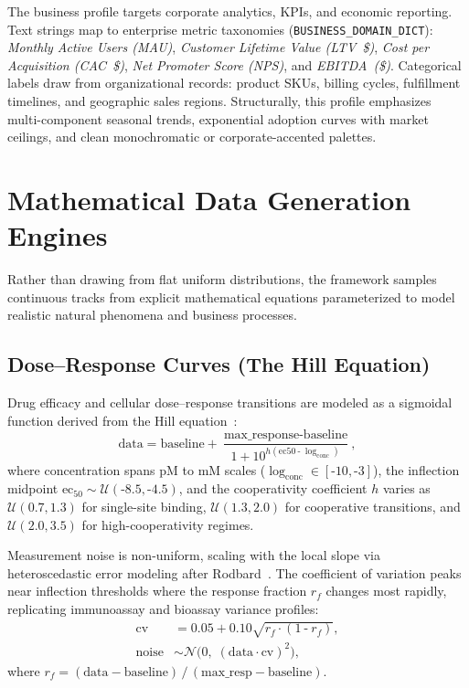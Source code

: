 \documentclass[11pt,twocolumn]{article}
\newcommand{\N}{\mathcal{N}}
\begin{document}
The business profile targets corporate analytics, KPIs, and economic reporting.
Text strings map to enterprise metric taxonomies (\texttt{BUSINESS\_DOMAIN\_DICT}): \emph{Monthly Active Users (MAU)}, \emph{Customer Lifetime Value (LTV~\$)}, \emph{Cost per Acquisition (CAC~\$)}, \emph{Net Promoter Score (NPS)}, and \emph{EBITDA~(\$)}.
Categorical labels draw from organizational records: product SKUs, billing cycles, fulfillment timelines, and geographic sales regions.
Structurally, this profile emphasizes multi-component seasonal trends, exponential adoption curves with market ceilings, and clean monochromatic or corporate-accented palettes.

\section{Mathematical Data Generation Engines}\label{sec:math}

Rather than drawing from flat uniform distributions, the framework samples continuous tracks from explicit mathematical equations parameterized to model realistic natural phenomena and business processes.

\subsection{Dose--Response Curves (The Hill Equation)}\label{sec:hill}

Drug efficacy and cellular dose--response transitions are modeled as a sigmoidal function derived from the Hill equation~\cite{hill1910dissociation}:
\begin{equation}\label{eq:hill}
  \text{data} = \text{baseline} + \frac{\text{max\_response} \mathbin{\text{-}} \text{baseline}}{1 + 10^{h(\text{ec50} \mathbin{\text{-}} \log_{\text{conc}})}},
\end{equation}
where concentration spans pM to mM scales ($\log_{\text{conc}} \in [\text{-}10, \text{-}3]$), the inflection midpoint $\text{ec}_{50} \sim \mathcal{U}(\text{-}8.5, \text{-}4.5)$, and the cooperativity coefficient $h$ varies as $\mathcal{U}(0.7, 1.3)$ for single-site binding, $\mathcal{U}(1.3, 2.0)$ for cooperative transitions, and $\mathcal{U}(2.0, 3.5)$ for high-cooperativity regimes.

Measurement noise is non-uniform, scaling with the local slope via heteroscedastic error modeling after Rodbard~\cite{rodbard1974statistical}. The coefficient of variation peaks near inflection thresholds where the response fraction $r_f$ changes most rapidly, replicating immunoassay and bioassay variance profiles:
\begin{align}
  \text{cv} &= 0.05 + 0.10\sqrt{r_f \cdot (1 \mathbin{\text{-}} r_f)}, \label{eq:cv}\\
  \text{noise} &\sim \N\!\bigl(0,\;(\text{data} \cdot \text{cv})^2\bigr), \label{eq:hill_noise}
\end{align}
where $r_f = (\text{data} - \text{baseline})\,/\,(\text{max\_resp} - \text{baseline})$.
\end{document}
